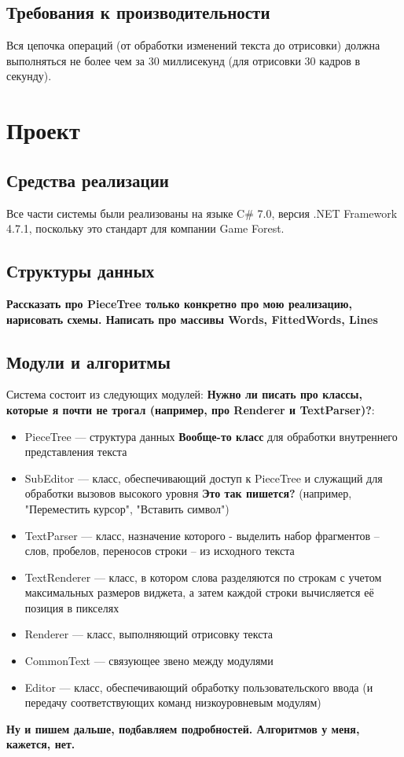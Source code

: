 \documentclass{fefu}
\begin{document}
		\subsection{Требования к производительности}
			Вся цепочка операций (от обработки изменений текста до 
			отрисовки) должна выполняться не более чем за 30 миллисекунд (для отрисовки 30 
			кадров в секунду).
	\section{Проект}
		\subsection{Средства реализации}
			Все части системы были реализованы на языке C\# 7.0, 
			версия .NET Framework 4.7.1, поскольку это стандарт для компании Game Forest.
		\subsection{Структуры данных}
			\textbf{Рассказать про PieceTree только конкретно про мою реализацию, нарисовать 
			схемы. Написать про массивы Words, FittedWords, Lines}
		\subsection{Модули и алгоритмы}
		\par Система состоит из следующих модулей: \textbf{Нужно ли писать про классы, которые я почти не 
		трогал (например, про Renderer и TextParser)?}:
		\begin{itemize}
			\item PieceTree --- структура данных \textbf{Вообще-то класс} для обработки 
			внутреннего представления текста
			\item SubEditor --- класс, обеспечивающий доступ к PieceTree и служащий для 
			обработки вызовов высокого уровня \textbf{Это так пишется?} (например, 
			"Переместить курсор", "Вставить символ")
			\item TextParser --- класс, назначение которого - выделить набор фрагментов -- 
			слов, пробелов, переносов строки -- из исходного текста
			\item TextRenderer --- класс, в котором слова разделяются по строкам с учетом 
			максимальных размеров виджета, а затем каждой строки вычисляется её позиция 
			в пикселях
			\item Renderer --- класс, выполняющий отрисовку текста
			\item CommonText --- связующее звено между модулями
			\item Editor --- класс, обеспечивающий обработку пользовательского ввода (и 
			передачу соответствующих команд низкоуровневым модулям)
		\end{itemize}
		\textbf{Ну и пишем дальше, подбавляем подробностей. Алгоритмов у меня, кажется, нет.}
\end{document}
